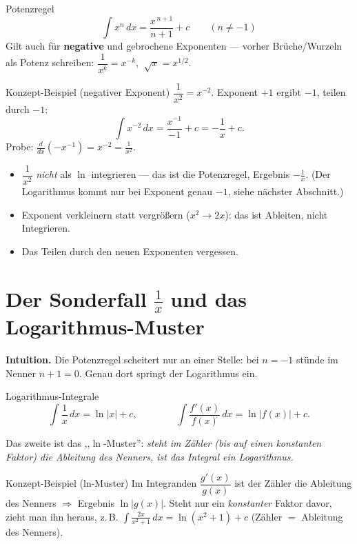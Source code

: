 \documentclass[a4paper,11pt]{article}
\begin{document}
\begin{satzbox}{Potenzregel}
\[
  \int x^{n}\,dx=\frac{x^{\,n+1}}{n+1}+c \qquad (n\neq -1)
\]
Gilt auch für \textbf{negative} und gebrochene Exponenten — vorher Brüche/Wurzeln als Potenz
schreiben: $\dfrac{1}{x^{k}}=x^{-k}$, $\ \sqrt{x}=x^{1/2}$.
\end{satzbox}

\begin{bspbox}{Konzept-Beispiel (negativer Exponent)}
$\dfrac{1}{x^{2}}=x^{-2}$. Exponent $+1$ ergibt $-1$, teilen durch $-1$:
\[
  \int x^{-2}\,dx=\frac{x^{-1}}{-1}+c=-\frac{1}{x}+c.
\]
Probe: $\frac{d}{dx}\!\left(-x^{-1}\right)=x^{-2}=\frac{1}{x^2}$. \checkmark
\end{bspbox}

\begin{fehlerbox}
\begin{itemize}[leftmargin=1.4em,itemsep=2pt]
  \item $\dfrac{1}{x^2}$ \emph{nicht} als $\ln$ integrieren — das ist die Potenzregel,
        Ergebnis $-\frac1x$. (Der Logarithmus kommt nur bei Exponent genau $-1$, siehe nächster
        Abschnitt.)
  \item Exponent verkleinern statt vergrößern ($x^2\to 2x$): das ist Ableiten, nicht Integrieren.
  \item Das Teilen durch den neuen Exponenten vergessen.
\end{itemize}
\end{fehlerbox}

\section{Der Sonderfall $\tfrac1x$ und das Logarithmus-Muster}

\textbf{Intuition.} Die Potenzregel scheitert nur an einer Stelle: bei $n=-1$ stünde im Nenner
$n+1=0$. Genau dort springt der Logarithmus ein.

\begin{satzbox}{Logarithmus-Integrale}
\[
  \int \frac{1}{x}\,dx=\ln|x|+c,
  \qquad\qquad
  \int \frac{f'(x)}{f(x)}\,dx=\ln\bigl|f(x)\bigr|+c.
\]
\end{satzbox}

Das zweite ist das ,,$\ln$-Muster'': \emph{steht im Zähler (bis auf einen konstanten Faktor)
die Ableitung des Nenners, ist das Integral ein Logarithmus.}

\begin{bspbox}{Konzept-Beispiel (ln-Muster)}
Im Integranden $\dfrac{g'(x)}{g(x)}$ ist der Zähler die Ableitung des Nenners $\Rightarrow$
Ergebnis $\ln|g(x)|$. Steht nur ein \emph{konstanter} Faktor davor, zieht man ihn heraus, z.\,B.
$\displaystyle\int\frac{2x}{x^2+1}\,dx=\ln(x^2+1)+c$ (Zähler $=$ Ableitung des Nenners).
\end{bspbox}
\end{document}
